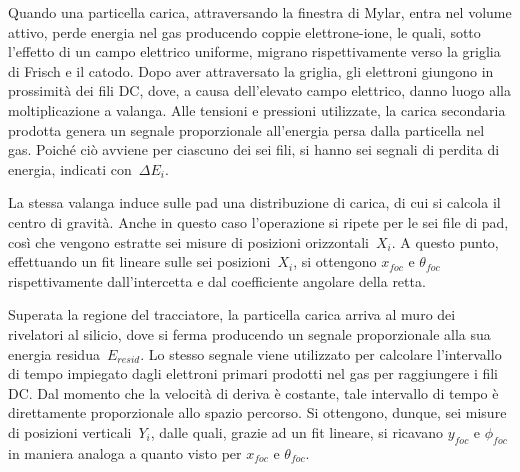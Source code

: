 Quando una particella carica, attraversando la finestra di Mylar, entra nel volume attivo, perde energia nel gas producendo coppie elettrone-ione, le quali, sotto l'effetto di un campo elettrico uniforme, migrano rispettivamente verso la griglia di Frisch e il catodo. 
Dopo aver attraversato la griglia, gli elettroni giungono in prossimità dei fili DC, dove, a causa dell'elevato campo elettrico, danno luogo alla moltiplicazione a valanga. 
Alle tensioni e pressioni utilizzate, la carica secondaria prodotta genera un segnale proporzionale all'energia persa dalla particella nel gas. 
Poiché ciò avviene per ciascuno dei sei fili, si hanno sei segnali di perdita di energia, indicati con~$\Delta E_i$.





La stessa valanga induce sulle pad una distribuzione di carica, di cui si calcola il centro di gravità. Anche in questo caso l'operazione si ripete per le sei file di pad, così che vengono estratte sei misure di posizioni orizzontali~$X_i$.
A questo punto, effettuando un fit lineare sulle sei posizioni~$X_i$, si ottengono $x_{foc}$ e $\theta_{foc}$ rispettivamente dall'intercetta e dal coefficiente angolare della retta.

Superata la regione del tracciatore, la particella carica arriva al muro dei rivelatori al silicio, dove si ferma producendo un segnale proporzionale alla sua energia residua~$E_{resid}$. 
Lo stesso segnale viene utilizzato per calcolare l'intervallo di tempo impiegato dagli elettroni primari prodotti nel gas per raggiungere i fili DC. 
Dal momento che la velocità di deriva è costante, tale intervallo di tempo è direttamente proporzionale allo spazio percorso. Si ottengono, dunque, sei misure di posizioni verticali~$Y_i$, dalle quali, grazie ad un fit lineare, si ricavano $y_{foc}$ e $\phi_{foc}$ in maniera analoga a quanto visto per $x_{foc}$ e $\theta_{foc}$.


